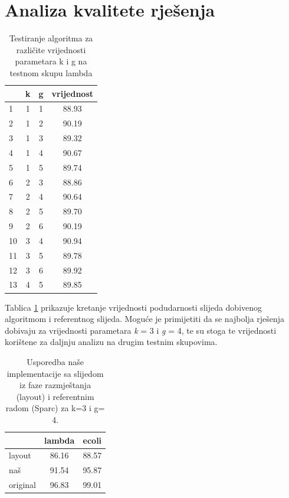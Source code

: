 \documentclass[times, utf8, seminar, numeric]{fer}
\begin{document}
\section{Analiza kvalitete rješenja}
\begin{table}[htb]
	\centering
	\begin{tabular}{l|ccc}
		& \multicolumn{1}{l}{k} &g 		&vrijednost\\ 	\hline
		 	1			&1	 	&1 		& 88.93 \\ 		\hline
		 	2			&1	 	&2		& 90.19 \\ 		\hline
		 	3			&1	 	&3 		& 89.32 \\ 		\hline
		 	4			&1	 	&4 		& 90.67 \\ 		\hline
		 	5			&1	 	&5 		& 89.74 \\ 		\hline
		 	6			&2	 	&3 		& 88.86 \\ 		\hline
		 	7			&2	 	&4		& 90.64 \\ 		\hline
		 	8			&2	 	&5		& 89.70 \\ 		\hline
		 	9			&2	 	&6 		& 90.19 \\ 		\hline
		 	10			&3	 	&4 		& 90.94 \\ 		\hline
		 	11			&3	 	&5 		& 89.78 \\ 		\hline
		 	12			&3	 	&6 		& 89.92 \\ 		\hline
		 	13			&4	 	&5 		& 89.85 \\ 		\hline
	\end{tabular}
	\caption{Testiranje algoritma za različite vrijednosti parametara k i g na testnom skupu lambda}
	\label{table:lambda_test}
\end{table}

Tablica \ref{table:lambda_test} prikazuje kretanje vrijednosti podudarnosti slijeda dobivenog algoritmom i referentnog slijeda. Moguće je primijetiti da se najbolja rješenja dobivaju za vrijednosti parametara \emph{k} = 3 i \emph{g} = 4, te su stoga te vrijednosti korištene za daljnju analizu na drugim testnim skupovima.

\begin{table}[htb]
	\centering
	\begin{tabular}{l|cc}
		& \multicolumn{1}{l}{lambda} & ecoli \\ 	\hline
		layout 					& 86.16 	& 88.57 \\ 	\hline
		naš  					& 91.54     & 95.87 \\	\hline
		original		   		& 96.83 	& 99.01 \\ 
	\end{tabular}
	\caption{Usporedba naše implementacije sa slijedom iz faze razmještanja (layout) i referentnim radom (Sparc) za k=3 i g= 4.}
	\label{table:kvaliteta}
\end{table}
\end{document}
